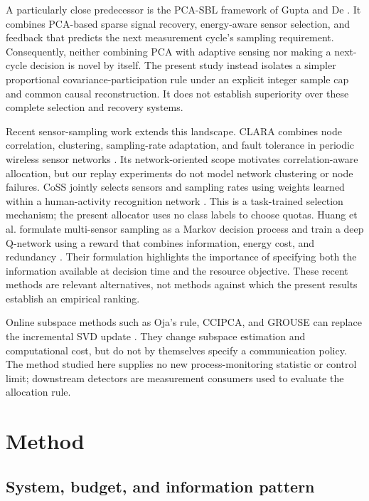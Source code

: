 \documentclass[pdflatex,sn-vancouver-num]{sn-jnl}
\theoremstyle{thmstyleone}
\begin{document}
A particularly close predecessor is the PCA-SBL framework of Gupta and De
\cite{gupta2018sbl}. It combines PCA-based sparse signal recovery, energy-aware
sensor selection, and feedback that predicts the next measurement cycle's
sampling requirement. Consequently, neither combining PCA with adaptive sensing
nor making a next-cycle decision is novel by itself. The present study instead
isolates a simpler proportional covariance-participation rule under an explicit
integer sample cap and common causal reconstruction. It does not establish
superiority over these complete selection and recovery systems.

Recent sensor-sampling work extends this landscape. CLARA combines node
correlation, clustering, sampling-rate adaptation, and fault tolerance in
periodic wireless sensor networks \cite{harb2024clara}. Its network-oriented
scope motivates correlation-aware allocation, but our replay experiments do
not model network clustering or node failures. CoSS jointly selects sensors
and sampling rates using weights learned within a human-activity recognition
network \cite{liu2026coss}. This is a task-trained selection mechanism; the
present allocator uses no class labels to choose quotas. Huang et al. formulate
multi-sensor sampling as a Markov decision process and train a deep Q-network
using a reward that combines information, energy cost, and redundancy
\cite{huang2025dqn}. Their formulation highlights the importance of specifying
both the information available at decision time and the resource objective.
These recent methods are relevant alternatives, not methods against which the
present results establish an empirical ranking.

Online subspace methods such as Oja's rule, CCIPCA, and GROUSE can replace the
incremental SVD update \cite{oja1982simplified,weng2003ccipca,balzano2010grouse}.
They change subspace estimation and computational cost, but do not by themselves
specify a communication policy. The method studied here supplies no new
process-monitoring statistic or control limit; downstream detectors are
measurement consumers used to evaluate the allocation rule.

\section{Method}

\subsection{System, budget, and information pattern}
\end{document}
